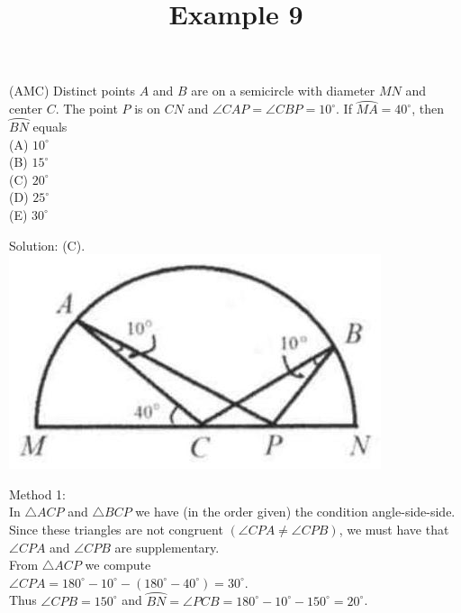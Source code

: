 \documentclass{article}
\title{Example 9}
\date{}
\begin{document}
\maketitle

(AMC) Distinct points \(A\) and \(B\) are on a semicircle with diameter \(M N\) and center \(C\). The point \(P\) is on \(C N\) and \(\angle C A P=\angle C B P=10^{\circ}\). If \(\wideparen{M A}=40^{\circ}\), then \(\wideparen{B N}\) equals\\
(A) \(10^{\circ}\)\\
(B) \(15^{\circ}\)\\
(C) \(20^{\circ}\)\\
(D) \(25^{\circ}\)\\
(E) \(30^{\circ}\)

Solution: (C).\\
\centering
\includegraphics[width=\textwidth]{images/problem_image_1.jpg}

Method 1:\\
In \(\triangle A C P\) and \(\triangle B C P\) we have (in the order given) the condition angle-side-side.\\
Since these triangles are not congruent \((\angle C P A \neq \angle C P B)\), we must have that \(\angle C P A\) and \(\angle C P B\) are supplementary.\\
From \(\triangle A C P\) we compute\\
\(\angle C P A=180^{\circ}-10^{\circ}-\left(180^{\circ}-40^{\circ}\right)=30^{\circ}\).\\
Thus \(\angle C P B=150^{\circ}\) and \(\wideparen{B N}=\angle P C B=180^{\circ}-10^{\circ}-150^{\circ}=20^{\circ}\).
\end{document}
